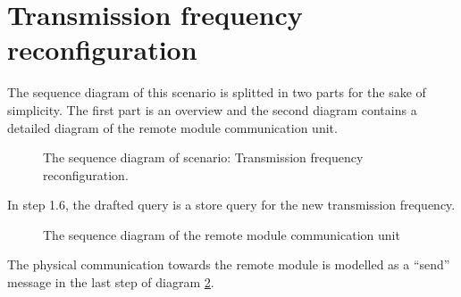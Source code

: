 \section{Transmission frequency reconfiguration}

\npar The sequence diagram of this scenario is splitted in two parts for the
sake of simplicity. The first part is an overview and the second diagram
contains a detailed diagram of the remote module communication unit.

\begin{figure}
	\begin{centering}
		\caption{The sequence diagram of scenario: Transmission frequency reconfiguration.}
		\label{fig:scenario-5-3-2}
	\end{centering}
\end{figure}

\npar In step 1.6, the drafted query is a store query for the new transmission
frequency. 

\begin{figure}
	\begin{centering}
		\caption{The sequence diagram of the remote module communication unit}
		\label{fig:scenario-5-3-2a}
	\end{centering}
\end{figure}

\npar The physical communication towards the remote module is modelled as a
``send'' message in the last step of diagram \ref{fig:scenario-5-3-2a}.
